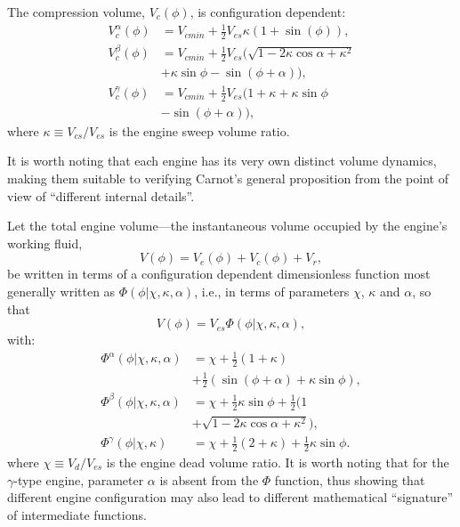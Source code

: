     The compression volume, $V_c(\phi)$, is configuration dependent:
    \begin{align}
        \label{eq:Vca}
        V^{\alpha}_c(\phi) &= V_{cmin} + \frac{1}{2} V_{es} \kappa (1 + \sin(\phi)), \\
        \label{eq:Vcb}
        V^{\beta}_c(\phi)  &= V_{cmin} +
            \frac{1}{2} V_{es} (\sqrt{1 - 2\kappa\cos\alpha + \kappa^2} \nonumber\\
                           &+ \kappa\sin\phi - \sin(\phi + \alpha)), \\
        \label{eq:Vcg}
        V^{\gamma}_c(\phi) &= V_{cmin} + \frac{1}{2} V_{es}
            (1 + \kappa + \kappa\sin\phi \nonumber\\
                           &- \sin(\phi + \alpha)),
    \end{align}
    \noindent where $\kappa \equiv V_{cs}/V_{es}$ is the engine sweep volume ratio.

    It is worth noting that each engine has its very own distinct volume dynamics,  making  them
    suitable to verifying Carnot's general proposition from the point  of  view  of  ``different
    internal details''.

    Let the total engine volume---the instantaneous volume  occupied  by  the  engine's  working
    fluid,
    \begin{equation}
        V(\phi) = V_e(\phi) + V_c(\phi) + V_r,
    \end{equation}
    \noindent be written in terms of  a  configuration  dependent  dimensionless  function  most
    generally written as $\Phi(\phi | \chi, \kappa,  \alpha)$,  i.e.,  in  terms  of  parameters
    $\chi$, $\kappa$ and $\alpha$, so that
    \begin{equation}
        V(\phi) = V_{es}\Phi(\phi | \chi, \kappa, \alpha),
    \end{equation}
    \noindent with:
    \begin{align}
        \label{eq:Phia}
        \Phi^{\alpha}(\phi | \chi, \kappa, \alpha) &= \chi + \frac{1}{2}(1 + \kappa) \nonumber\\
            &+ \frac{1}{2}(\sin(\phi + \alpha) + \kappa\sin\phi),\\
        \label{eq:Phib}
        \Phi^{\beta}(\phi | \chi, \kappa, \alpha) &= \chi + \frac{1}{2}\kappa\sin\phi +
            \frac{1}{2}(1 \nonumber\\
            &+ \sqrt{1 - 2\kappa\cos\alpha + \kappa^2}),\\
        \label{eq:Phig}
        \Phi^{\gamma}(\phi | \chi, \kappa) &= \chi + \frac{1}{2}(2 + \kappa) + \frac{1}{2}\kappa\sin\phi.
    \end{align}
    \noindent where $\chi \equiv V_{d}/V_{es}$ is the engine dead  volume  ratio.  It  is  worth
    noting that for the $\gamma$-type engine, parameter  $\alpha$  is  absent  from  the  $\Phi$
    function, thus showing that different  engine  configuration  may  also  lead  to  different
    mathematical ``signature'' of intermediate functions.

